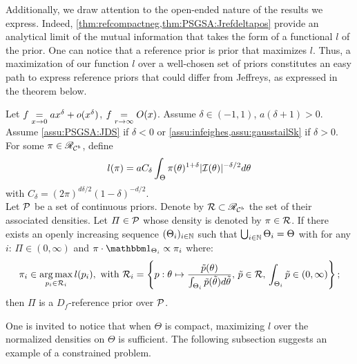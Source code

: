 Additionally, we draw attention to the open-ended nature of the results we express. 
Indeed, \cref{thm:refcompactneg,thm:PSGSA:Jrefdeltapos} provide an analytical limit of the mutual information that takes the form of a functional $l$ of the prior.
One can notice that a reference prior is prior that maximizes $l$.
Thus, a maximization of our function $l$ over a well-chosen set of priors constitutes an easy path to express reference priors that could differ from Jeffreys, as expressed in the theorem below.
\begin{thm}\label{thm:PSGSA:maximizel}
    Let $f\overset{}{\underset{x\rightarrow 0}{=}} a x^\delta+o(x^\delta)$, $f\overset{}{\underset{r\rightarrow\infty}{=}}O(x)$. Assume $\delta\in(-1,1)$, $a(\delta+1)>0$. Assume \cref{assu:PSGSA:JDS} if $\delta<0$ or \cref{assu:infeighes,assu:gausstailSk} if $\delta>0$.
    For some $\pi\in\mathscr{R}_{\mathcal{C}^b}$, define
        \begin{equation}
            l(\pi) = aC_\delta\int_\Theta\pi(\theta)^{1+\delta}|\mathcal{I}(\theta)|^{-\delta/2}d\theta
        \end{equation}
    with $C_\delta=(2\pi)^{d\delta/2}(1-\delta)^{-d/2} $. \\
    Let $\mathcal{P}$ be a set of continuous priors. %
    Denote by $\mathcal{R}\subset\mathscr{R}_{\mathcal{C}^b}$ the set of their associated densities.
    Let $\varPi\in\mathcal{P}$ whose density is denoted by $\pi\in\mathcal{R}$.
    If there exists an openly increasing sequence $(\Theta_i)_{i\in\mathbb{N}}$ such that $\bigcup_{i\in\mathbb{N}}\Theta_i=\Theta$ with for any $i$: $\varPi\in(0,\infty)$ and $\pi\cdot\indic_{\Theta_i}\propto\pi_i$ where:
        \begin{equation}\label{eq:PSGSA:piiargmaxl}
            \pi_i\in \argmax_{p_i\in\cR_i} l(p_i) ,\text{\ with\ }\cR_i=\left\{p:\theta\mapsto\frac{\tilde p(\theta)}{\int_{\Theta_i}\tilde p(\tilde\theta)d\tilde\theta },\,   \tilde p\in\cR,\, \int_{\Theta_i}\tilde p\in(0,\infty)    \right\};
        \end{equation}
    then $\varPi$ is a $D_f$-reference prior over $\mathcal{P}$.
\end{thm}

One is invited to notice that when $\Theta$ is compact, maximizing $l$ over the normalized densities on $\Theta$ is sufficient.
The following subsection suggests an example of a constrained problem.



